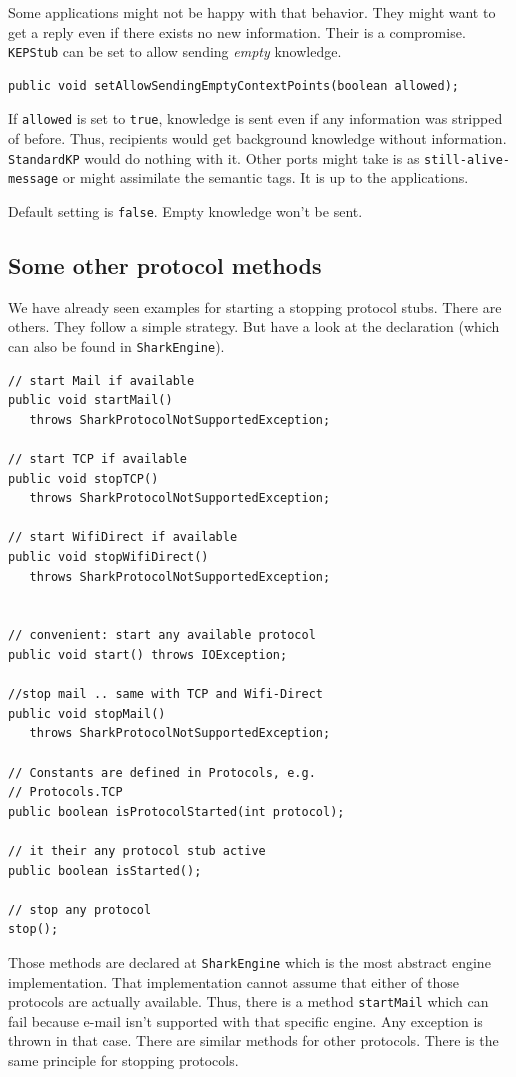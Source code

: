 Some applications might not be happy with that behavior. They might want to get a reply even if there exists no new information. Their is a compromise. {\tt KEPStub} can be set to allow sending {\it empty} knowledge.

\begin{verbatim}
public void setAllowSendingEmptyContextPoints(boolean allowed);
\end{verbatim}

If {\tt allowed} is set to {\tt true}, knowledge is sent even if any information was stripped of before. Thus, recipients would get background knowledge without information. {\tt StandardKP} would do nothing with it. Other ports might take is as {\tt still-alive-message} or might assimilate the semantic tags. It is up to the applications.

Default setting is {\tt false}. Empty knowledge won't be sent.

\subsection{Some other protocol methods}
We have already seen examples for starting a stopping protocol stubs. 
There are others. They follow a simple strategy. But have a look at the
declaration (which can also be found in {\tt SharkEngine}).

\begin{verbatim}
// start Mail if available
public void startMail()
   throws SharkProtocolNotSupportedException;

// start TCP if available
public void stopTCP() 
   throws SharkProtocolNotSupportedException;

// start WifiDirect if available
public void stopWifiDirect() 
   throws SharkProtocolNotSupportedException;


// convenient: start any available protocol
public void start() throws IOException;

//stop mail .. same with TCP and Wifi-Direct
public void stopMail()
   throws SharkProtocolNotSupportedException;

// Constants are defined in Protocols, e.g.
// Protocols.TCP
public boolean isProtocolStarted(int protocol);

// it their any protocol stub active
public boolean isStarted();

// stop any protocol
stop();
\end{verbatim}

Those methods are declared at {\tt SharkEngine} which is the most
abstract engine implementation. That implementation cannot assume that
either of those protocols are actually available. Thus, there is a
method {\tt startMail} which can fail because e-mail isn't supported with 
that specific engine. Any exception is thrown in that case. There are
similar methods for other protocols. There is the same principle for stopping protocols. 

